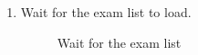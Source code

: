 \documentclass[ManualeUtente]{subfiles}
\begin{document}
\begin{enumerate}
		\item Wait for the exam list to load.
		\begin{figure}[H]
			\centering
			\caption{Wait for the exam list}
			\label{fig:Wait for the exam list}
		\end{figure}
	\end{enumerate}
	\newpage
\end{document}
